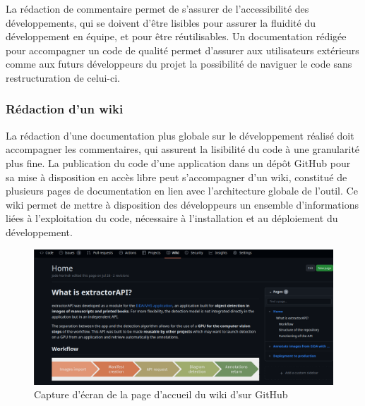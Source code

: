 	La rédaction de commentaire permet de s'assurer de l'accessibilité des développements, qui se doivent d'être lisibles pour assurer la fluidité du développement en équipe, et pour être réutilisables. Un documentation rédigée pour accompagner un code de qualité permet d'assurer aux utilisateurs extérieurs comme aux futurs développeurs du projet la possibilité de naviguer le code sans restructuration de celui-ci.

    \subsubsection{Rédaction d'un wiki}
    La rédaction d'une documentation plus globale sur le développement réalisé doit accompagner les commentaires, qui assurent la lisibilité du code à une granularité plus fine. La publication du code d'une application dans un dépôt GitHub pour sa mise à disposition en accès libre peut s'accompagner d'un wiki, constitué de plusieurs pages de documentation en lien avec l'architecture globale de l'outil. Ce wiki permet de mettre à disposition des développeurs un ensemble d'informations liées à l'exploitation du code, nécessaire à l'installation et au déploiement du développement.
    
    \begin{figure}[h]
    	\centering
    	\includegraphics[width=15cm]{images/exapi_wiki.png}
    	\caption{Capture d'écran de la page d'accueil du wiki d'\exapi sur GitHub}
    	\label{fig:exapi_wiki}
    \end{figure}
    
